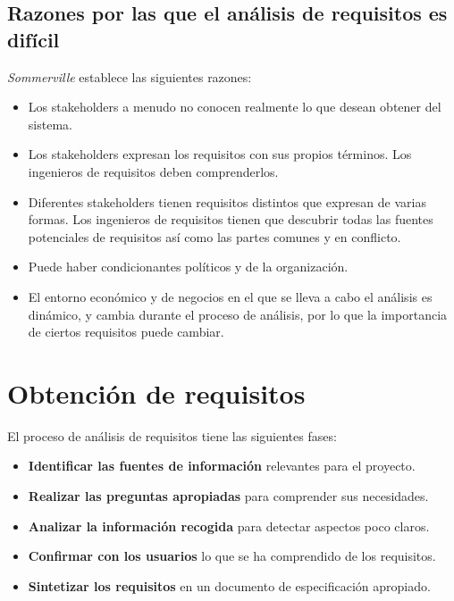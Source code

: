 \subsection{Razones por las que el análisis de requisitos es difícil}
\textit{Sommerville} establece las siguientes razones:
\begin{itemize}
    \item Los stakeholders a menudo no conocen realmente lo que desean obtener del sistema.
    \item Los stakeholders expresan los requisitos con sus propios términos. Los ingenieros de requisitos deben comprenderlos.
    \item Diferentes stakeholders tienen requisitos distintos que expresan de varias formas. Los ingenieros de requisitos tienen que descubrir todas las fuentes potenciales de requisitos así como las partes comunes y en conflicto.
    \item Puede haber condicionantes políticos y de la organización.
    \item El entorno económico y de negocios en el que se lleva a cabo el análisis es dinámico, y cambia durante el proceso de análisis, por lo que la importancia de ciertos requisitos puede cambiar.
\end{itemize}


\section{Obtención de requisitos} %
El proceso de análisis de requisitos tiene las siguientes fases:
\begin{itemize}
    \item \textbf{Identificar las fuentes de información} relevantes para el proyecto.
    \item \textbf{Realizar las preguntas apropiadas} para comprender sus necesidades.
    \item \textbf{Analizar la información recogida} para detectar aspectos poco claros.
    \item \textbf{Confirmar con los usuarios} lo que se ha comprendido de los requisitos.
    \item \textbf{Sintetizar los requisitos} en un documento de especificación apropiado.
\end{itemize}

